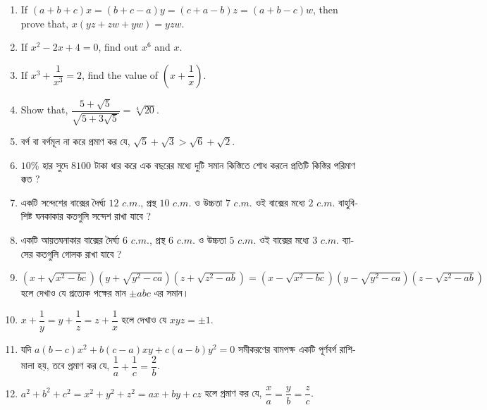 \documentclass[11pt, a4paper]{article}
\begin{document}
\begin{enumerate}
	\item If $(a+b+c)x = (b+c-a)y = (c+a-b)z = (a+b-c)w$, then prove that, $x(yz + zw + yw) = yzw$.
	
	\item If $x^2 - 2x + 4 = 0$, find out $x^6$ and $x$.
	
	\item If $x^3 + \dfrac{1}{x^3} = 2$, find the value of $\left( x + \dfrac{1}{x} \right)$.
	
	\item Show that, $\dfrac{5 + \sqrt{5}}{\sqrt{5 + 3\sqrt{5}}} = \sqrt[4]{20}$.
	
	\item \textbengali{বর্গ বা বর্গমূল না করে প্রমাণ কর যে,} $\sqrt{5} + \sqrt{3} > \sqrt{6} + \sqrt{2}$.
	
	\item $10\%$ \textbengali{হার সুদে} $8100$  \textbengali{টাকা ধার করে এক বছরের মধ্যে দুটি সমান কিস্তিতে শোধ করলে প্রতিটি কিস্তির পরিমাণ ক্কত ?}
	
	\item \textbengali{একটি সন্দেশের বাক্সের দৈর্ঘ্য} $12$ $c.m.$, \textbengali{প্রস্থ} $10$ $c.m.$ \textbengali{ও উচ্চতা} $7$ $c.m.$ \textbengali{ওই বাক্সের মধ্যে} $2$ $c.m.$ \textbengali{বাহুবিশিষ্ট ঘনকাকার কতগুলি সন্দেশ রাখা যাবে ?}
	
	\item \textbengali{একটি আয়তঘনাকার বাক্সের দৈর্ঘ্য} $6$ $c.m.$, \textbengali{প্রস্থ} $6$ $c.m.$ \textbengali{ও উচ্চতা} $5$ $c.m.$ \textbengali{ওই বাক্সের মধ্যে} $3$ $c.m.$ \textbengali{ব্যাসের কতগুলি গোলক রাখা যাবে ?}
	
	\item $\left(x + \sqrt{x^2 - bc}\right) \left(y + \sqrt{y^2 - ca}\right) \left(z + \sqrt{z^2 - ab}\right) = \left(x - \sqrt{x^2 - bc}\right) \left(y - \sqrt{y^2 - ca}\right) \left(z - \sqrt{z^2 - ab}\right)$ \textbengali{হলে দেখাও যে প্রত্যেক পক্ষের মান} $\pm abc$ \textbengali{এর সমান।}
	
	\item $x+\dfrac{1}{y} = y+\dfrac{1}{z} = z+\dfrac{1}{x}$ \textbengali{হলে দেখাও যে} $xyz = \pm 1$.

	\item \textbengali{যদি} $a(b-c)x^2 + b(c-a)xy + c(a-b)y^2 = 0$ \textbengali{সমীকরণের বামপক্ষ একটি পূর্ণবর্গ রাশিমালা হয়, তবে প্রমাণ কর যে,} $\dfrac{1}{a} + \dfrac{1}{c} = \dfrac{2}{b}$.
	
	\item $a^2 + b^2 + c^2 = x^2 + y^2 + z^2 = ax + by + cz$ \textbengali{হলে প্রমাণ কর যে,} $\dfrac{x}{a} = \dfrac{y}{b} = \dfrac{z}{c}$.
	

\end{enumerate}
\end{document}

